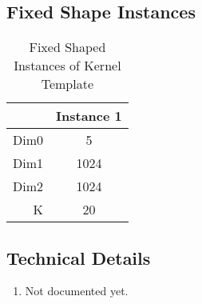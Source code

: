\documentclass[•]{article}
\begin{document}
\subsection{Fixed Shape Instances}
\begin{table}[htbp] %
\caption{Fixed Shaped Instances of Kernel Template}
\label{tab:shapes_concat}
	\begin{center}
		\begin{tabular}{|r|c|} 
		\hline	
		  & Instance 1\\ 
		\hline	
		Dim0 &
			5 \\ 
		\hline
		Dim1 & 
			1024\\
		\hline
		Dim2 & 
			1024\\
		\hline
		K & 
			20\\
		\hline
		\end{tabular}
	\end{center}
\end{table}

\subsection{Technical Details}
\begin{enumerate}
\item Not documented yet.
\end{enumerate}
\end{document}
